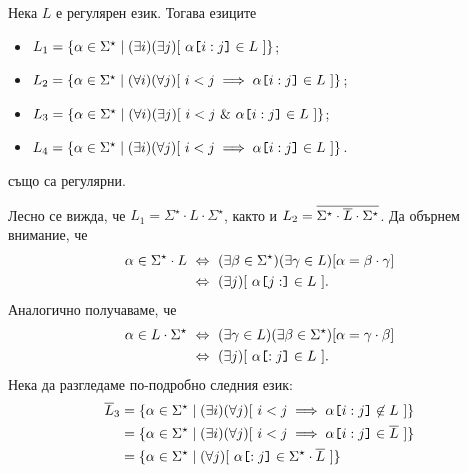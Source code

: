 \begin{extra}

  
\begin{problem}
  Нека $L$ е регулярен език. Тогава езиците
  \begin{itemize}
  \item
    $L_1 = \{ \alpha \in \Sigma^\star \mid (\exists i)(\exists j)[\ \alpha\texttt{[}{i:j}\texttt{]} \in L\ ]\}$;
  \item
    $L_2 = \{ \alpha \in \Sigma^\star \mid (\forall i)(\forall j)[\ i < j \implies \alpha\slice{i:j} \in L\ ]\}$;
  \item 
    $L_3 = \{ \alpha \in \Sigma^\star \mid (\forall i)(\exists j)[\ i < j\ \&\ \alpha\slice{i:j} \in L\ ]\}$;
  \item
    $L_4 = \{ \alpha \in \Sigma^\star \mid (\exists i)(\forall j)[\ i < j \implies \alpha\slice{i:j} \in L\ ]\}$.
  \end{itemize}
  също са регулярни.
\end{problem}
\begin{hint}
  Лесно се вижда, че $L_1 = \Sigma^\star \cdot L \cdot \Sigma^\star$, както и $L_2 = \overline{\Sigma^\star \cdot \overline{L} \cdot \Sigma^\star}$.
  Да обърнем внимание, че
  \begin{align*}
    \alpha \in \Sigma^\star \cdot L & \iff (\exists \beta \in \Sigma^\star)(\exists \gamma \in L)[ \alpha = \beta \cdot \gamma]\\
                                    & \iff (\exists j)[\ \alpha\slice{j:} \in L\ ].
  \end{align*}
  Аналогично получаваме, че
    \begin{align*}
      \alpha \in L\cdot \Sigma^\star & \iff (\exists \gamma \in L)(\exists \beta \in \Sigma^\star)[ \alpha = \gamma \cdot \beta ]\\
                                     & \iff (\exists j)[\ \alpha\slice{:j} \in L\ ].
  \end{align*}
  Нека да разгледаме по-подробно следния език:
  \begin{align*}
    \ov{L}_3 & = \{\alpha \in \Sigma^\star \mid (\exists i)(\forall j)[\ i < j \implies \alpha\slice{i:j} \not\in L\ ]\}\\
             & = \{\alpha \in \Sigma^\star \mid (\exists i)(\forall j)[\ i < j \implies \alpha\slice{i:j} \in \ov{L}\ ]\}\\
             & = \{\alpha \in \Sigma^\star \mid (\forall j)[\ \alpha\slice{:j} \in \Sigma^\star \cdot \ov{L}\ ]\}

\end{align*}
\end{hint}
\end{extra}

